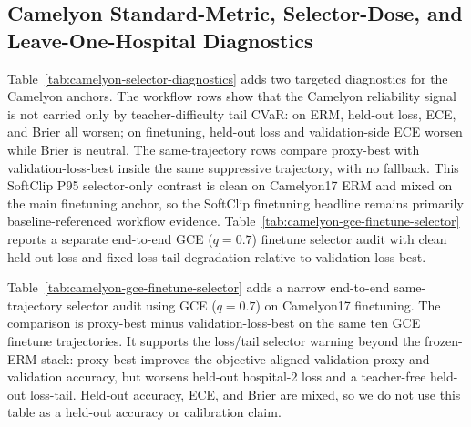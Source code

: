 \subsection{Camelyon Standard-Metric, Selector-Dose, and Leave-One-Hospital Diagnostics}
\label{app:camelyon-selector-diagnostics}
Table~\ref{tab:camelyon-selector-diagnostics} adds two targeted diagnostics for the Camelyon anchors.
The workflow rows show that the Camelyon reliability signal is not carried only by teacher-difficulty tail CVaR: on ERM, held-out loss, ECE, and Brier all worsen; on finetuning, held-out loss and validation-side ECE worsen while Brier is neutral.
The same-trajectory rows compare proxy-best with validation-loss-best inside the same suppressive trajectory, with no fallback.
This SoftClip P95 selector-only contrast is clean on Camelyon17 ERM and mixed on the main finetuning anchor, so the SoftClip finetuning headline remains primarily baseline-referenced workflow evidence.
Table~\ref{tab:camelyon-gce-finetune-selector} reports a separate end-to-end GCE ($q=0.7$) finetune selector audit with clean held-out-loss and fixed loss-tail degradation relative to validation-loss-best.

\begin{table}[h]
  \centering
  \scriptsize
  \resizebox{\columnwidth}{!}{}
  \caption{
    Camelyon standard-metric triangulation and same-trajectory selector-only contrasts.
    Workflow rows compare the proxy-selected suppressive checkpoint with the baseline-selected undistorted checkpoint.
    Same-trajectory rows compare proxy-best with validation-loss-best on the same suppressive P95 trajectory and do not use fallback.
    $\Delta$Tail is teacher-difficulty tail CVaR, used here as a fixed-bank stress diagnostic.
    For Camelyon17 finetune rows, ECE/Brier are validation-side calibration diagnostics from the saved finetune selector-calibration artifact; the ERM rows use held-out/test calibration.
    Workflow-row intervals are regenerated in this standard-metric triangulation artifact; small endpoint differences from Table~\ref{tab:core-case-uncertainty} reflect separate bootstrap resampling of the same seed-matched deltas.
  }
  \label{tab:camelyon-selector-diagnostics}
\end{table}

Table~\ref{tab:camelyon-gce-finetune-selector} adds a narrow end-to-end same-trajectory selector audit using GCE ($q=0.7$) on Camelyon17 finetuning.
The comparison is proxy-best minus validation-loss-best on the same ten GCE finetune trajectories.
It supports the loss/tail selector warning beyond the frozen-ERM stack: proxy-best improves the objective-aligned validation proxy and validation accuracy, but worsens held-out hospital-2 loss and a teacher-free held-out loss-tail.
Held-out accuracy, ECE, and Brier are mixed, so we do not use this table as a held-out accuracy or calibration claim.

